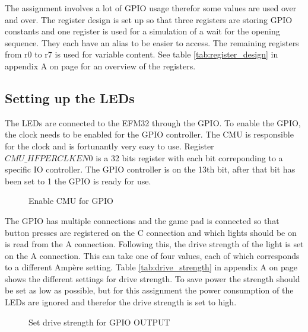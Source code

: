 The assignment involves a lot of GPIO usage therefor some values are used over and over. The register design is set up so that three registers are storing GPIO constants and one register is used for a simulation of a wait for the opening sequence. They each have an alias to be easier to access. The remaining registers from r0 to r7 is used for variable content. See table \ref{tab:register_design} in appendix A on page \pageref{tab:register_design} for an overview of the registers.

\subsection{Setting up the LEDs}
\label{subsec:dev_pros_setup_led}

The LEDs are connected to the EFM32 through the GPIO. To enable the GPIO, the clock needs to be enabled for the GPIO controller. The CMU is responsible for the clock and is fortunantly very easy to use. Register $CMU\_HFPERCLKEN0$ is a 32 bits register with each bit correponding to a specific IO controller. The GPIO controller is on the 13th bit, after that bit has been set to 1 the GPIO is ready for use.

\begin{figure}[h!]
\caption{Enable CMU for GPIO}
\label{code:enable_cmu_gpio}
\end{figure}

The GPIO has multiple connections and the game pad is connected so that button presses are registered on the C connection and which lights should be on is read from the A connection. Following this, the drive strength of the light is set on the A connection. This can take one of four values, each of which corresponds to a different Ampère setting. Table \ref{tab:drive_strength} in appendix A on page \pageref{tab:drive_strength} shows the different settings for drive strength. To save power the strength should be set as low as possible, but for this assignment the power consumption of the LEDs are ignored and therefor the drive strength is set to high.

\begin{figure}[h!]
\caption{Set drive strength for GPIO OUTPUT}
\label{code:set_drive_gpio_o}
\end{figure}

